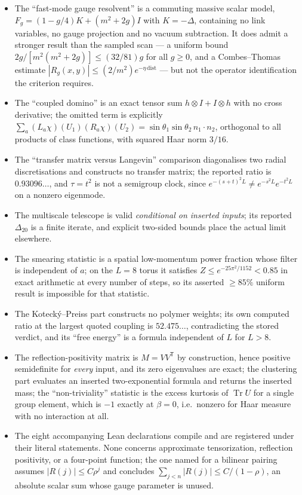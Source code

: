 \documentclass[11pt]{article}
\theoremstyle{definition}
\theoremstyle{remark}
\DeclareMathOperator{\Tr}{Tr}
\begin{document}
\begin{itemize}\itemsep2pt
\item The ``fast-mode gauge resolvent'' is a commuting massive scalar model,
  $F_g=(1-g/4)K+(m^2+2g)I$ with $K=-\Delta$, containing no link variables, no
  gauge projection and no vacuum subtraction. It does admit a stronger result
  than the sampled scan --- a uniform bound $2g/[m^2(m^2+2g)]\le(32/81)g$ for
  all $g\ge0$, and a Combes--Thomas estimate
  $|R_g(x,y)|\le(2/m^2)e^{-\eta\,\mathrm{dist}}$ --- but not the operator
  identification the criterion requires.
\item The ``coupled domino'' is an exact tensor sum
  $h\otimes I+I\otimes h$ with no cross derivative; the omitted term is
  explicitly $\sum_a(L_a\chi)(U_1)(R_a\chi)(U_2)
  =\sin\theta_1\sin\theta_2\,n_1\!\cdot\!n_2$, orthogonal to all products of
  class functions, with squared Haar norm $3/16$.
\item The ``transfer matrix versus Langevin'' comparison diagonalises two
  radial discretisations and constructs no transfer matrix; the reported ratio
  is $0.93096\ldots$, and $\tau=t^2$ is not a semigroup clock, since
  $e^{-(s+t)^2L}\ne e^{-s^2L}e^{-t^2L}$ on a nonzero eigenmode.
\item The multiscale telescope is valid \emph{conditional on inserted inputs};
  its reported $\Delta_{20}$ is a finite iterate, and explicit two-sided bounds
  place the actual limit elsewhere.
\item The smearing statistic is a spatial low-momentum power fraction whose
  filter is independent of $a$; on the $L=8$ torus it satisfies
  $Z\le e^{-25\pi^2/1152}<0.85$ in exact arithmetic at every number of steps,
  so its asserted $\ge85\%$ uniform result is impossible for that statistic.
\item The Kotecký--Preiss part constructs no polymer weights; its own computed
  ratio at the largest quoted coupling is $52.475\ldots$, contradicting the
  stored verdict, and its ``free energy'' is a formula independent of $L$ for
  $L>8$.
\item The reflection-positivity matrix is $M=VV^{\mathsf T}$ by construction,
  hence positive semidefinite for \emph{every} input, and its zero eigenvalues
  are exact; the clustering part evaluates an inserted two-exponential formula
  and returns the inserted mass; the ``non-triviality'' statistic is the excess
  kurtosis of $\Tr U$ for a single group element, which is $-1$ exactly at
  $\beta=0$, i.e.\ nonzero for Haar measure with no interaction at all.
\item The eight accompanying Lean declarations compile and are registered under
  their literal statements. None concerns approximate tensorization, reflection
  positivity, or a four-point function; the one named for a bilinear pairing
  assumes $|R(j)|\le C\rho^j$ and concludes $\sum_{j<n}|R(j)|\le C/(1-\rho)$,
  an absolute scalar sum whose gauge parameter is unused.
\end{itemize}
\end{document}

